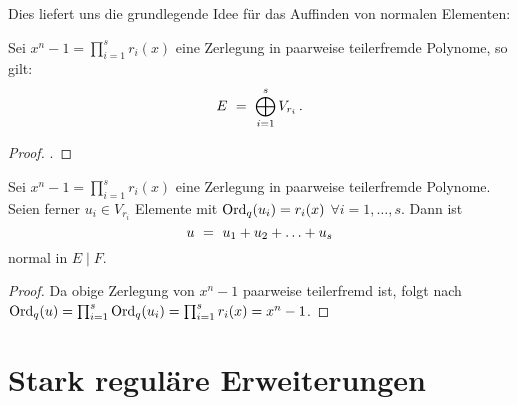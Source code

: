 Dies liefert uns die grundlegende Idee für das Auffinden von normalen
Elementen:
\begin{lemma}
  Sei $x^n-1 = \prod_{i=1}^s r_i(x)$ eine Zerlegung in paarweise teilerfremde
  Polynome, so gilt:
  \[ E \ =\  \bigoplus_{i=1}^s V_{r_i} \,.\]
\end{lemma}
\begin{proof}
  \TODO.
\end{proof}

\begin{kor}
  Sei $x^n-1 = \prod_{i=1}^s r_i(x)$ eine Zerlegung in paarweise teilerfremde
  Polynome. Seien ferner $u_i \in V_{r_i}$ Elemente mit 
  $\operatorname{Ord}_q(u_i) = r_i(x)$ $\forall i=1,\ldots,s$. Dann ist
  \[ u \ =\  u_1 + u_2 + \ldots + u_s\]
  normal in $E \mid F$.
\end{kor}
\begin{proof}
  Da obige Zerlegung von $x^n-1$ paarweise teilerfremd ist, folgt nach
  $\operatorname{Ord}_q(u) = \prod_{i=1}^s \operatorname{Ord}_q(u_i) = \prod_{i=1}^s r_i(x) = x^n -1$.
\end{proof}

\section{Stark reguläre Erweiterungen}

